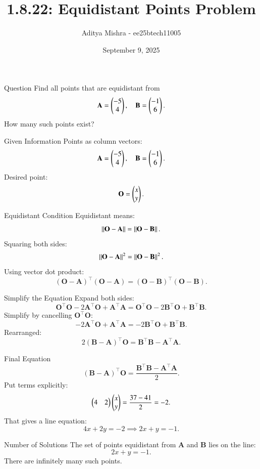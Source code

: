 \documentclass{beamer}
\title{1.8.22: Equidistant Points Problem}
\author{Aditya Mishra - ee25btech11005}
\date{September 9, 2025}
\begin{document}
\frame{\titlepage}
\begin{frame}{Question}
Find all points that are equidistant from 
\[
\mathbf{A} = \begin{pmatrix}-5 \\ 4\end{pmatrix}, \quad
\mathbf{B} = \begin{pmatrix}-1 \\ 6\end{pmatrix}.
\]
How many such points exist?
\end{frame}

\begin{frame}{Given Information}
Points as column vectors:
\[
\mathbf{A} = \begin{pmatrix}-5 \\ 4\end{pmatrix}, \quad
\mathbf{B} = \begin{pmatrix}-1 \\ 6\end{pmatrix}.
\]
Desired point:
\[
\mathbf{O} = \begin{pmatrix}x \\ y\end{pmatrix}.
\]
\end{frame}

\begin{frame}{Equidistant Condition}
Equidistant means:
\[
\left\Vert \mathbf{O} - \mathbf{A} \right\Vert = \left\Vert \mathbf{O} - \mathbf{B} \right\Vert.
\]
Squaring both sides:
\[
\left\Vert \mathbf{O} - \mathbf{A} \right\Vert^2 = \left\Vert \mathbf{O} - \mathbf{B} \right\Vert^2.
\]
Using vector dot product:
\[
(\mathbf{O} - \mathbf{A})^\top (\mathbf{O} - \mathbf{A}) = (\mathbf{O} - \mathbf{B})^\top (\mathbf{O} - \mathbf{B}).
\]
\end{frame}

\begin{frame}{Simplify the Equation}
Expand both sides:
\[
\mathbf{O}^\top \mathbf{O} - 2 \mathbf{A}^\top \mathbf{O} + \mathbf{A}^\top \mathbf{A} = \mathbf{O}^\top \mathbf{O} - 2 \mathbf{B}^\top \mathbf{O} + \mathbf{B}^\top \mathbf{B}.
\]
Simplify by cancelling \(\mathbf{O}^\top \mathbf{O}\):
\[
- 2 \mathbf{A}^\top \mathbf{O} + \mathbf{A}^\top \mathbf{A} = - 2 \mathbf{B}^\top \mathbf{O} + \mathbf{B}^\top \mathbf{B}.
\]
Rearranged:
\[
2 (\mathbf{B} - \mathbf{A})^\top \mathbf{O} = \mathbf{B}^\top \mathbf{B} - \mathbf{A}^\top \mathbf{A}.
\]
\end{frame}

\begin{frame}{Final Equation}
\[
(\mathbf{B} - \mathbf{A})^\top \mathbf{O} = \frac{\mathbf{B}^\top \mathbf{B} - \mathbf{A}^\top \mathbf{A}}{2}.
\]
Put terms explicitly:
\[
\begin{pmatrix}4 & 2\end{pmatrix} \begin{pmatrix}x \\ y\end{pmatrix} =
\frac{37 - 41}{2} = -2.
\]
That gives a line equation:
\[
4x + 2y = -2 \implies 2x + y = -1.
\]
\end{frame}

\begin{frame}{Number of Solutions}
The set of points equidistant from \(\mathbf{A}\) and \(\mathbf{B}\) lies on the line:
\[
2x + y = -1.
\]
There are infinitely many such points.
\end{frame}
\end{document}
